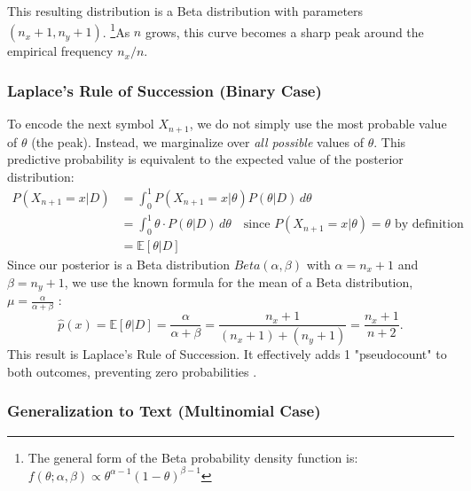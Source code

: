 \documentclass[11pt,a4paper]{article}
\theoremstyle{definition} %
\begin{document}
This resulting distribution is a Beta distribution with parameters $(n_x+1, n_y+1)$. \footnote{The general form of the Beta probability density function is: $f(\theta; \alpha, \beta) \propto \theta^{\alpha-1}(1-\theta)^{\beta-1}$}As $n$ grows, this curve becomes a sharp peak around the empirical frequency $n_x/n$.

\subsubsection{Laplace's Rule of Succession (Binary Case)}
To encode the next symbol $X_{n+1}$, we do not simply use the most probable value of $\theta$ (the peak). Instead, we marginalize over \textit{all possible} values of $\theta$. This predictive probability is equivalent to the expected value of the posterior distribution:
\begin{align} \label{eq:expect}
    P(X_{n+1} = x | D) & = \int_0^1 P(X_{n+1} = x | \theta) P(\theta | D) \, d\theta                                                          \\
                       & = \int_0^1 \theta \cdot P(\theta | D) \, d\theta \quad \text{since $P(X_{n+1} = x | \theta) = \theta$ by definition} \\
                       & = \mathbb{E}[\theta | D]
\end{align}
Since our posterior is a Beta distribution $Beta(\alpha, \beta)$ with $\alpha = n_x+1$ and $\beta = n_y+1$, we use the known formula for the mean of a Beta distribution, $\mu = \frac{\alpha}{\alpha+\beta}$ \cite{mackay,weisberg}:
\begin{equation}
    \hat{p}(x) = \mathbb{E}[\theta | D] = \frac{\alpha}{\alpha + \beta} = \frac{n_x + 1}{(n_x + 1) + (n_y + 1)} = \frac{n_x + 1}{n + 2}.
\end{equation}
This result is Laplace's Rule of Succession. It effectively adds 1 "pseudocount" to both outcomes, preventing zero probabilities \cite[p. 52]{mackay}.

\subsubsection{Generalization to Text (Multinomial Case)}
\end{document}
